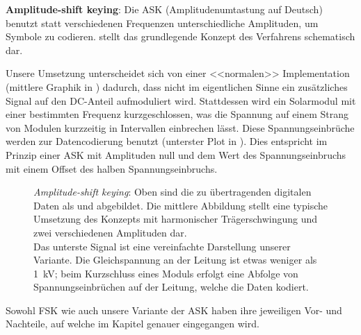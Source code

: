 \textbf{Amplitude-shift  keying}: Die  ASK (Amplitudenumtastung  auf  Deutsch)
benutzt statt verschiedenen Frequenzen unterschiedliche Amplituden, um Symbole
zu  codieren.    stellt  das  grundlegende  Konzept  des
Verfahrens schematisch dar.

Unsere  Umsetzung unterscheidet  sich  von  einer <<normalen>>   Implementation
(mittlere   Graphik  in   )  dadurch,   dass  nicht   im
eigentlichen Sinne  ein zus\"atzliches  Signal auf den  DC-Anteil aufmoduliert
wird. Stattdessen   wird  ein   Solarmodul  mit   einer  bestimmten   Frequenz
kurzgeschlossen,  was die  Spannung auf  einem Strang  von Modulen  kurzzeitig
in  Intervallen  einbrechen  l\"asst. Diese  Spannungseinbr\"uche  werden  zur
Datencodierung  benutzt   (unterster  Plot   in  ). Dies
entspricht  im  Prinzip  einer  ASK  mit Amplituden  null  und  dem  Wert  des
Spannungseinbruchs mit einem Offset des halben Spannungseinbruchs.


\begin{figure}[h!tb]
    \centering
    
    \caption{%
        \emph{Amplitude-shift  keying}: Oben   sind  die   zu  \"ubertragenden
        digitalen  Daten als   und   abgebildet. Die  mittlere
        Abbildung stellt eine typische Umsetzung des Konzepts mit harmonischer
        Tr\"agerschwingung und zwei verschiedenen Amplituden dar.\protect\\
        Das  unterste   Signal  ist  eine  vereinfachte   Darstellung  unserer
        Variante.  Die  Gleichspannung an  der Leitung  ist etwas  weniger als
        \SI{1}{\kilo\volt}; beim Kurzschluss eines Moduls erfolgt eine Abfolge
        von Spannungseinbr\"uchen auf der Leitung, welche die Daten kodiert.%
    }
    \label{fig:ask:concept}
\end{figure}


Sowohl  FSK wie  auch  unsere  Variante der  ASK  haben  ihre jeweiligen  Vor-
und  Nachteile,  auf  welche im  Kapitel  \emph{}  genauer
eingegangen wird.
